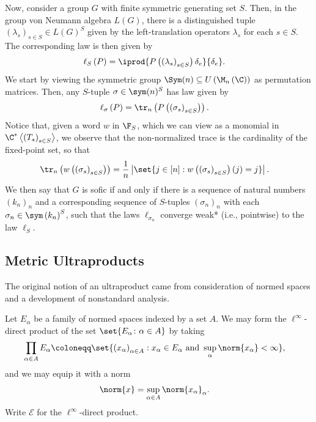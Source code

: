 \documentclass[10pt]{mypackage}
\renewcommand{\coloneq}{\coloneqq}
\begin{document}
Now, consider a group $G$ with finite symmetric generating set $S$. Then, in the group von Neumann algebra $L(G)$, there is a distinguished tuple $\left( \lambda_s \right)_{s\in S}\in L(G)^{S}$ given by the left-translation operators $\lambda_s$ for each $s\in S$. The corresponding law is then given by
\begin{align*}
  \ell_S\left( P \right) &= \iprod{P\left( \left( \lambda_s \right)_{s\in S} \right)\delta_e}{\delta_e}.
\end{align*}
We start by viewing the symmetric group $\Sym(n)\subseteq U\left( \M_n\left( \C \right) \right)$ as permutation matrices. Then, any $S$-tuple $\sigma\in \sym(n)^{S}$ has law given by
\begin{align*}
  \ell_{\sigma}\left( P \right) &= \tr_n\left( P\left( \left( \sigma_s \right)_{s\in S} \right) \right).
\end{align*}
Notice that, given a word $w$ in $\F_S$, which we can view as a monomial in $\C^{\ast}\left\langle \left( T_s \right)_{s\in S} \right\rangle$, we observe that the non-normalized trace is the cardinality of the fixed-point set, so that
\begin{align*}
  \tr_n\left( w\left( \left( \sigma_s \right)_{s\in S} \right) \right) &= \frac{1}{n}\left\vert \set{j\in [n] : w\left( \left( \sigma_{s} \right)_{s\in S} \right)(j) = j} \right\vert.
\end{align*}
We then say that $G$ is sofic if and only if there is a sequence of natural numbers $\left( k_n \right)_{n}$ and a corresponding sequence of $S$-tuples $\left( \sigma_n \right)_{n}$ with each $\sigma_n\in \sym\left( k_n \right)^{S}$, such that the laws $\ell_{\sigma_n}$ converge weak* (i.e., pointwise) to the law $\ell_S$.

\subsection{Metric Ultraproducts}%
The original notion of an ultraproduct came from consideration of normed spaces and a development of nonstandard analysis.

Let $E_{\alpha}$ be a family of normed spaces indexed by a set $A$. We may form the $\ell^{\infty}$-direct product of the set $\set{E_{\alpha}\colon \alpha\in A}$ by taking
\begin{align*}
  \prod_{\alpha\in A} E_{\alpha} &\coloneq \set{\left( x_{\alpha} \right)_{\alpha\in A} : x_{\alpha}\in E_{\alpha}\text{ and }\sup_{\alpha}\norm{x_{\alpha}} < \infty},
\end{align*}
and we may equip it with a norm
\begin{align*}
  \norm{x} &= \sup_{\alpha\in A} \norm{x_{\alpha}}_{\alpha}.
\end{align*}
Write $ \mathcal{E} $ for the $\ell^{\infty}$-direct product.
\end{document}
